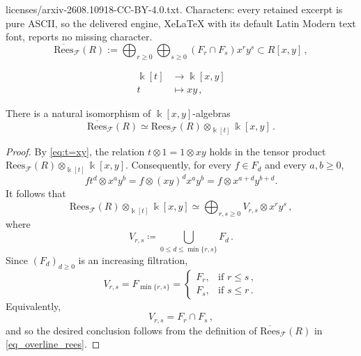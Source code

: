 \documentclass[10pt,a4paper]{amsart}
\newcommand{\cF} {\mathcal{F}}
\newcommand{\kk} {\Bbbk}
\begin{document}
licenses/arxiv-2608.10918-CC-BY-4.0.txt. Characters: every retained excerpt is pure ASCII, so the delivered engine, XeLaTeX with its default Latin Modern text font, reports no missing character.
\begin{equation}
\label{eq_overline_rees}
     \overline{\mathrm{Rees}}_\cF(R) := \bigoplus_{r \geq 0} \bigoplus_{s \geq 0} (F_r \cap F_s) x^r y^s    \subset R[x,y] \,,
\end{equation}

\begin{align}
\label{eq:t=xy}
    \kk[t] & \longrightarrow \kk[x,y] \\
    \nonumber
    t &\longmapsto xy \,,
\end{align}

\begin{lemma}
\label{lem:isomprhismAtilde}
There is a natural isomorphism of $\kk[x,y]$-algebras
\[ \overline{\mathrm{Rees}}_\cF(R) \simeq \mathrm{Rees}_\cF(R) \otimes_{\kk[t]} \kk[x,y] \,.\]
\end{lemma}

\begin{proof}
By \eqref{eq:t=xy}, the relation
$t\otimes 1 = 1\otimes xy$
holds in the tensor product
$\mathrm{Rees}_{\mathcal F}(R)\otimes_{\kk[t]}\kk[x,y]$.
Consequently, for every \(f\in F_d\) and every \(a,b\ge 0\),
\[
f t^d\otimes x^a y^b
 = f\otimes (xy)^d x^a y^b
 = f\otimes x^{a+d}y^{b+d}.
\]
It follows that
\[
\mathrm{Rees}_{\mathcal F}(R)\otimes_{\kk[t]}\kk[x,y]
\simeq
\bigoplus_{r,s\ge0} V_{r,s}\otimes x^r y^s\,,
\]
where
\[
V_{r,s}
\coloneqq
\bigcup_{0\le d\le \min\{r,s\}} F_d\,.
\]
Since \((F_d)_{d\ge0}\) is an increasing filtration,
\[
V_{r,s}
=
F_{\min\{r,s\}}
=
\begin{cases}
F_r, & \text{if } r\le s\,,\\
F_s, & \text{if } s\le r\,.
\end{cases}
\]
Equivalently,
\[
V_{r,s}=F_r\cap F_s\,,
\]
and so the desired conclusion follows from the definition of
\(\overline{\mathrm{Rees}}_{\mathcal F}(R)\) in \eqref{eq_overline_rees}.
\end{proof}
\end{document}
